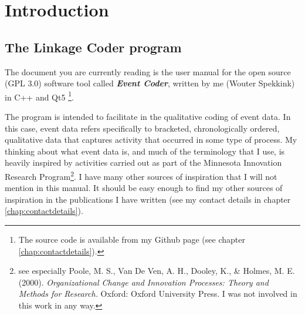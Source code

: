 \documentclass{memoir}
\begin{document}

\tableofcontents
\chapter{Introduction}
\label{chap:introduction}

\section{The Linkage Coder program}
\label{sec:eventcoderprogram}

The document you are currently reading is the user manual for the open source (GPL 3.0) software tool called \emph{\textbf{Event Coder}}, written by me (Wouter Spekkink) in C++ and Qt5 \footnote{The source code is available from my Github page (see chapter \ref{chap:contactdetails}).}.

The program is intended to facilitate in the qualitative coding of event data. In this case, event data refers specifically to bracketed, chronologically ordered, qualitative data that captures activity that occurred in some type of process. My thinking about what event data is, and much of the terminology that I use, is heavily inspired by activities carried out as part of the Minnesota Innovation Research Program\footnote{see especially Poole, M. S., Van De Ven, A. H., Dooley, K., \& Holmes, M. E. (2000). \emph{Organizational Change and Innovation Processes: Theory and Methods for Research.} Oxford: Oxford University Press. I was not involved in this work in any way.}. I have many other sources of inspiration that I will not mention in this manual. It should be easy enough to find my other sources of inspiration in the publications I have written (see my contact details in chapter \ref{chap:contactdetails}).
\end{document}

